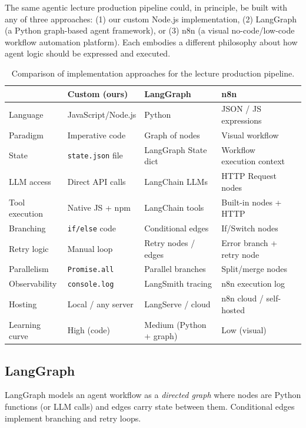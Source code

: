 \documentclass[12pt,a4paper]{article}
\begin{document}
The same agentic lecture production pipeline could, in principle, be built
with any of three approaches: (1) our custom Node.js implementation,
(2) LangGraph (a Python graph-based agent framework), or
(3) n8n (a visual no-code/low-code workflow automation platform).
Each embodies a different philosophy about how agent logic should be
expressed and executed.

\begin{table}[h]
\centering\small
\begin{tabular}{@{}lllll@{}}
\toprule
 & \textbf{Custom (ours)} & \textbf{LangGraph} & \textbf{n8n} \\
\midrule
Language       & JavaScript/Node.js & Python          & JSON / JS expressions \\
Paradigm       & Imperative code    & Graph of nodes  & Visual workflow \\
State          & \texttt{state.json} file & LangGraph State dict & Workflow execution context \\
LLM access     & Direct API calls   & LangChain LLMs  & HTTP Request nodes \\
Tool execution & Native JS + npm    & LangChain tools & Built-in nodes + HTTP \\
Branching      & \texttt{if/else} code & Conditional edges & If/Switch nodes \\
Retry logic    & Manual loop        & Retry nodes / edges & Error branch + retry node \\
Parallelism    & \texttt{Promise.all} & Parallel branches  & Split/merge nodes \\
Observability  & \texttt{console.log} & LangSmith tracing & n8n execution log \\
Hosting        & Local / any server & LangServe / cloud & n8n cloud / self-hosted \\
Learning curve & High (code)        & Medium (Python + graph) & Low (visual) \\
\bottomrule
\end{tabular}
\caption{Comparison of implementation approaches for the lecture production pipeline.}
\end{table}

\subsection{LangGraph}

LangGraph models an agent workflow as a \emph{directed graph} where nodes are
Python functions (or LLM calls) and edges carry state between them. Conditional
edges implement branching and retry loops.
\end{document}
